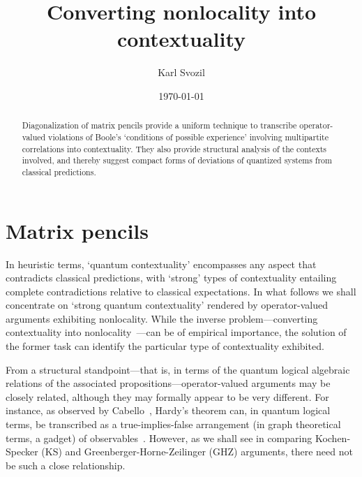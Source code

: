 \documentclass[
  twocolumn,
 showpacs,
 showkeys,
 preprintnumbers,
 amsmath,amssymb,
 aps,
 prl,
  longbibliography,
 floatfix,
 ]{revtex4-2}
\begin{document}
\title{Converting nonlocality into contextuality}



\author{Karl Svozil}




\date{\today}

\begin{abstract}
Diagonalization of matrix pencils provide a uniform technique to transcribe operator-valued violations of Boole's `conditions of possible experience' involving multipartite correlations into contextuality. They also provide structural analysis of the contexts involved, and thereby suggest compact forms of deviations of quantized systems from classical predictions.
\end{abstract}


\maketitle


\section{Matrix pencils}

In heuristic terms, `quantum contextuality' encompasses any aspect that contradicts classical predictions, with `strong' types of contextuality entailing complete contradictions relative to classical expectations.
In what follows we shall concentrate on `strong quantum contextuality' rendered by operator-valued arguments exhibiting nonlocality.
While the inverse problem---converting contextuality into nonlocality~\cite{cabello2020converting}---can be of empirical importance,
the solution of the former task can identify the particular type of contextuality exhibited.

From a structural standpoint---that is, in terms of the quantum logical algebraic relations of the associated propositions---operator-valued arguments may be closely related,
although they may formally appear to be very different. For instance, as observed by Cabello~\cite{cabello-96,Cabello-2013-Hardylike}, Hardy's theorem \cite{Hardy-92,Hardy-93} can,
in quantum logical terms, be transcribed as a true-implies-false arrangement (in graph theoretical terms, a gadget) of observables~\cite{2018-minimalYIYS,svozil-2020-hardy}.
However, as we shall see in comparing Kochen-Specker (KS) and Greenberger-Horne-Zeilinger (GHZ) arguments, there need not be such a close relationship.
\end{document}
